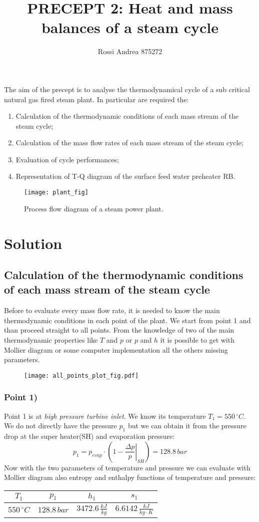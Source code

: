 \documentclass[a4paper,12pt]{article}
\title{\textbf{PRECEPT 2}: Heat and mass balances of a steam cycle }
\author{Rossi Andrea 875272}
\date{}
\newcommand{\celsius}[0]{\,^{\circ}C}
\newcommand{\kjkg}[0]{\,\frac{kJ}{kg}}
\newcommand{\kjkgk}[0]{\,\frac{kJ}{kg \cdot K}}
\newcommand{\md}[0]{Mollier diagram }
\newcommand{\pointdatatable}[5]{
\begin{center}
\tabulinesep=1.2mm
\begin{tabu}{|c|c|c|c|}
\hline
$ T_{#1} $ & $ p_{#1} $ & $ h_{#1} $ & $ s_{#1} $\\ \hline
$ #2 \celsius $ & $ #3 \,bar $ & $ #4 \kjkg $ & $ #5 \kjkgk $\\ \hline
\end{tabu}
\end{center}
}
\begin{document}
\maketitle

The aim of the precept is to analyse the thermodynamical cycle of a sub critical natural gas fired steam plant. In particular are required the:

\begin{enumerate}[label=\Alph*]
\item Calculation of the thermodynamic conditions of each mass stream of the steam cycle;
\item Calculation of the mass flow rates of each mass stream of the steam cycle;
\item Evaluation of cycle performances; 
\item Representation of T-Q diagram of the surface feed water preheater RB. 
\end{enumerate}

\begin{figure}[h]
  \caption{Process flow diagram of a steam power plant.}
  \centering
    \texttt{[image: plant\_fig]}
\end{figure}

\section{Solution}

\subsection{Calculation of the thermodynamic conditions of each mass stream of the steam cycle} 

Before to evaluate every mass flow rate, it is needed to know the main thermodynamic conditions in each point of the plant. We start from point 1 and than proceed straight to all points. From the knowledge of two of the main thermodynamic properties like $T$ and $p$ or $p$ and $h$ it is possible to get with \md or some computer implementation all the others missing parameters.

\begin{figure}[h]
	\centering
    \texttt{[image: all\_points\_plot\_fig.pdf]}
\end{figure}

\subsubsection*{Point 1)}
Point 1 is at \emph{high pressure turbine inlet}. We know its temperature $T_1=550\celsius$. We do not directly have the pressure $p_1$ but we can obtain it from the pressure drop at the super heater(SH) and evaporation pressure:
\begin{equation}
p_1 = p_{evap} \cdot \left( 1- \left. \frac{\Delta p}{p} \right\rvert_{SH} \right) = 128.8\,bar
\end{equation}
Now with the two parameters of temperature and pressure we can evaluate with \md also entropy and enthalpy functions of temperature and pressure:
\pointdatatable{1}{550}{128.8}{3472.6}{6.6142}
%
%
%
\end{document}
